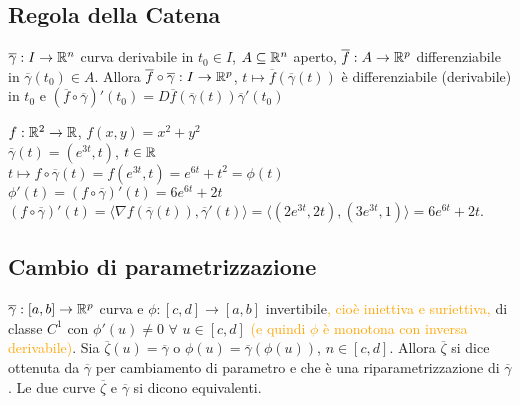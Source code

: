 \subsection{Regola della Catena}

\begin{theorem}
	$\overline{\gamma}: I \rightarrow \mathbb{R}^n$ curva derivabile in $t_0 \in I$, $A \subseteq \mathbb{R}^n$ aperto, $\overline{f}: A \rightarrow \mathbb{R}^p$ differenziabile in $\overline{\gamma}(t_0)\in A$. Allora 
	$\overline{f}\circ \overline{\gamma}: I \rightarrow \mathbb{R}^p$, $t \mapsto \overline{f}(\overline{\gamma}(t))$ è differenziabile (derivabile) in $t_0$ e $(\overline{f}\circ \overline{\gamma})'(t_0)=D\overline{f}(\overline{\gamma}(t))\overline{\gamma}'(t_0)$
\end{theorem}


\begin{exbar}
\begin{example}
	$f: \mathbb{R}^2 \rightarrow \mathbb{R}$, $f(x,y)=x^2+y^2$\\
	$\overline{\gamma} (t)=(e^{3t},t)$, $t \in \mathbb{R}$\\
	$t \mapsto f \circ \overline{\gamma}(t)=f(e^{3t},t)=e^{6t}+t^2=\phi(t)$\\
	$\phi' (t)=(f \circ \overline{\gamma})'(t)=6e^{6t}+2t$\\
	$(f \circ \overline{\gamma})'(t)=\langle\nabla f(\overline{\gamma}(t)), \overline{\gamma}'(t) \rangle= \langle (2e^{3t},2t),(3e^{3t},1)\rangle=6e^{6t}+2t$.
\end{example}
\end{exbar}


\subsection{Cambio di parametrizzazione}

\begin{definition}
	$\overline{\gamma}:[a,b]\rightarrow \mathbb{R}^p$ curva e $\phi: [c,d]\rightarrow [a,b]$ invertibile\textcolor{orange}{, cioè iniettiva e suriettiva,} di classe $C^1$ con $\phi'(u)\neq 0 \,\, \forall \,\, u \in [c,d]$ \textcolor{orange}{(e quindi $\phi$ è monotona con inversa derivabile)}. Sia $\overline{\zeta}(u)=\overline{\gamma}$ o $\phi(u)=\overline{\gamma}(\phi(u))$, $n \in [c,d]$. Allora $\overline{\zeta}$ si dice ottenuta da $\overline{\gamma}$ per cambiamento di parametro e che è una riparametrizzazione di $\overline{\gamma}$. Le due curve $\overline{\zeta}$ e $\overline{\gamma}$ si dicono equivalenti.
\end{definition}


